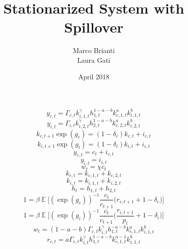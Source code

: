 \documentclass{article}
\title{Stationarized System with Spillover}
\author{Marco Brianti\\Laura Gati}
\date{April 2018}
\DeclareMathOperator{\E}{\mathbb{E}}
\begin{document}
	
	\maketitle

\Large{
	

\begin{equation}
y_{c,t} = \Gamma_{c,t} k_{i,1,t}^{\gamma} h_{1,t}^{1 - a- b} k_{c,1,t}^a k_{i,1,t}^b
\end{equation}
\begin{equation}
y_{i,t} = \Gamma_{i,t} k_{i,2,t}^{\gamma} h_{2,t}^{1 - a- b} k_{c,2,t}^a k_{i,2,t}^b
\end{equation}
\begin{equation}
k_{c,t+1} \exp{(g_c)} = (1 - \delta_c)k_{c,t} + i_{c,t}
\end{equation}
\begin{equation}
k_{i,t+1} \exp{(g_i)} = (1 - \delta_i)k_{i,t} + i_{i,t}
\end{equation}
\begin{equation}
y_{c,t} = c_{t} + i_{c,t}
\end{equation}
\begin{equation}
y_{i,t} = i_{i,t}
\end{equation}
\begin{equation}
w_{t} = \chi c_{t}
\end{equation}
\begin{equation}
k_{c,t} = k_{c,1,t} + k_{c,2,t}
\end{equation}
\begin{equation}
k_{i,t} = k_{i,1,t} + k_{i,2,t}
\end{equation}
\begin{equation}
h_{t} = h_{1,t} + h_{2,t}
\end{equation}
\begin{equation}
1 = \beta \E \bigg[ (\exp{(g_c)})^{-1} \frac{c_{t}}{c_{t+1}} \bigg( r_{c,t+1} + 1 - \delta_c   \bigg)     \bigg]
\end{equation}
\begin{equation}
1 = \beta \E \bigg[ (\exp{(g_i)})^{-1} \frac{c_{t}}{c_{t+1}} \bigg( \frac{r_{i,t+1}}{p_t} + 1 - \delta_i  \bigg)     \bigg]
\end{equation}
\begin{equation}
w_t = (1 - a - b)\Gamma_{c,t} k_{i,t}^{\gamma} h_{1,t}^{- a- b} k_{c,1,t}^a k_{i,1,t}^b
\end{equation}
\begin{equation}
r_{c,t} = a \Gamma_{c,t} k_{i,t}^{\gamma} h_{1,t}^{1 - a- b} k_{c,1,t}^{a-1} k_{i,1,t}^b

\end{equation}}
\end{document}
